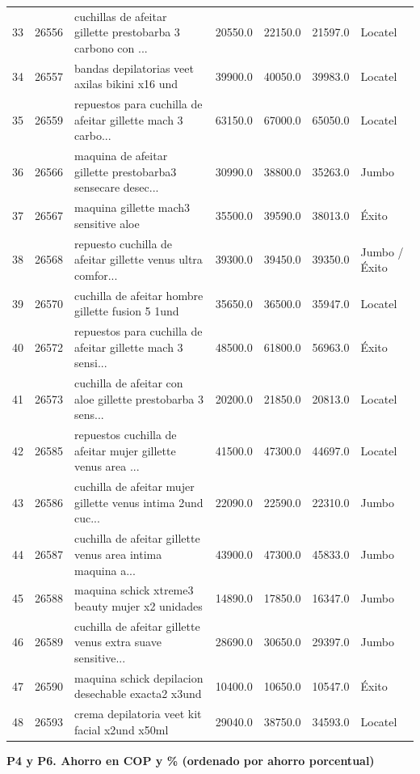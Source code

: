 \documentclass[
  spanish,
  letterpaper,
  DIV=11,
  numbers=noendperiod]{scrartcl}
\begin{document}
{\begin{longtable}[]{@{}lllllll@{}}
33 & 26556 & cuchillas de afeitar gillette prestobarba 3 carbono con ...
& 20550.0 & 22150.0 & 21597.0 & Locatel \\
34 & 26557 & bandas depilatorias veet axilas bikini x16 und & 39900.0 &
40050.0 & 39983.0 & Locatel \\
35 & 26559 & repuestos para cuchilla de afeitar gillette mach 3 carbo...
& 63150.0 & 67000.0 & 65050.0 & Locatel \\
36 & 26566 & maquina de afeitar gillette prestobarba3 sensecare desec...
& 30990.0 & 38800.0 & 35263.0 & Jumbo \\
37 & 26567 & maquina gillette mach3 sensitive aloe & 35500.0 & 39590.0 &
38013.0 & Éxito \\
38 & 26568 & repuesto cuchilla de afeitar gillette venus ultra comfor...
& 39300.0 & 39450.0 & 39350.0 & Jumbo / Éxito \\
39 & 26570 & cuchilla de afeitar hombre gillette fusion 5 1und & 35650.0
& 36500.0 & 35947.0 & Locatel \\
40 & 26572 & repuestos para cuchilla de afeitar gillette mach 3 sensi...
& 48500.0 & 61800.0 & 56963.0 & Éxito \\
41 & 26573 & cuchilla de afeitar con aloe gillette prestobarba 3 sens...
& 20200.0 & 21850.0 & 20813.0 & Locatel \\
42 & 26585 & repuestos cuchilla de afeitar mujer gillette venus area ...
& 41500.0 & 47300.0 & 44697.0 & Locatel \\
43 & 26586 & cuchilla de afeitar mujer gillette venus intima 2und cuc...
& 22090.0 & 22590.0 & 22310.0 & Jumbo \\
44 & 26587 & cuchilla de afeitar gillette venus area intima maquina a...
& 43900.0 & 47300.0 & 45833.0 & Jumbo \\
45 & 26588 & maquina schick xtreme3 beauty mujer x2 unidades & 14890.0 &
17850.0 & 16347.0 & Jumbo \\
46 & 26589 & cuchilla de afeitar gillette venus extra suave sensitive...
& 28690.0 & 30650.0 & 29397.0 & Jumbo \\
47 & 26590 & maquina schick depilacion desechable exacta2 x3und &
10400.0 & 10650.0 & 10547.0 & Éxito \\
48 & 26593 & crema depilatoria veet kit facial x2und x50ml & 29040.0 &
38750.0 & 34593.0 & Locatel \\
\end{longtable}
}

\textbf{P4 y P6. Ahorro en COP y \% (ordenado por ahorro porcentual)}
\end{document}
